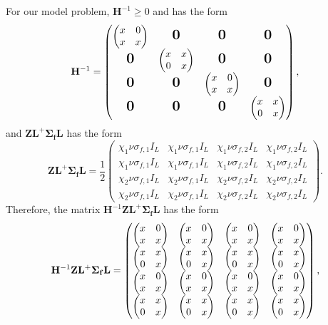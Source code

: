 For our model problem, $\mathbf{H}^{-1} \geq 0$ and has the form \cite{greenbaum1997iterative}
\begin{equation*}
	\mathbf{H}^{-1} = \begin{pmatrix}
  \begin{pmatrix}
  x & 0 \\
  x & x
  \end{pmatrix} & \bigzero & \bigzero & \bigzero \\
  \bigzero & 
  \begin{pmatrix}
  x & x \\
  0 & x
  \end{pmatrix} & \bigzero & \bigzero \\
  \bigzero & \bigzero & \begin{pmatrix}
  x & 0 \\
  x & x
  \end{pmatrix} & \bigzero \\
  \bigzero & \bigzero & \bigzero & \begin{pmatrix}
  x & x \\
  0 & x
  \end{pmatrix}
\end{pmatrix},
\end{equation*}
and $\mathbf{Z} \mathbf{L}^{+}  \mathbf{\Sigma_{f}} \mathbf{L}$ has the form
\begin{equation*}
\mathbf{Z} \mathbf{L}^{+}  \mathbf{\Sigma_{f}} \mathbf{L} = \frac{1}{2}
	\begin{pmatrix}
		\chi_{1} \nu \sigma_{f,1} I_{L} & \chi_{1}\nu \sigma_{f,1} I_{L}& \chi_{1}\nu \sigma_{f,2} I_{L} & \chi_{1} \nu \sigma_{f,2} I_{L} \\
		\chi_{1}\nu \sigma_{f,1} I_{L} & \chi_{1}\nu \sigma_{f,1} I_{L}& \chi_{1}\nu \sigma_{f,2} I_{L} & \chi_{1}\nu \sigma_{f,2} I_{L} \\
		\chi_{2}\nu \sigma_{f,1} I_{L} & \chi_{2}\nu \sigma_{f,1} I_{L}& \chi_{2}\nu \sigma_{f,2} I_{L} & \chi_{2}\nu \sigma_{f,2} I_{L} \\
		\chi_{2}\nu \sigma_{f,1} I_{L} & \chi_{2}\nu \sigma_{f,1} I_{L}& \chi_{2}\nu \sigma_{f,2} I_{L} & \chi_{2}\nu \sigma_{f,2} I_{L}
	\end{pmatrix}.
\end{equation*}
Therefore, the matrix $\mathbf{H}^{-1}\mathbf{Z} \mathbf{L}^{+}  \mathbf{\Sigma_{f}} \mathbf{L}$ has the form
\begin{equation*}
	\mathbf{H}^{-1}\mathbf{Z} \mathbf{L}^{+}  \mathbf{\Sigma_{f}} \mathbf{L} = \begin{pmatrix}
		\LTx & \LTx & \LTx & \LTx \\
		\UTx & \UTx & \UTx & \UTx \\
		\LTx & \LTx & \LTx & \LTx \\
		\UTx & \UTx & \UTx & \UTx
	\end{pmatrix},
\end{equation*}
